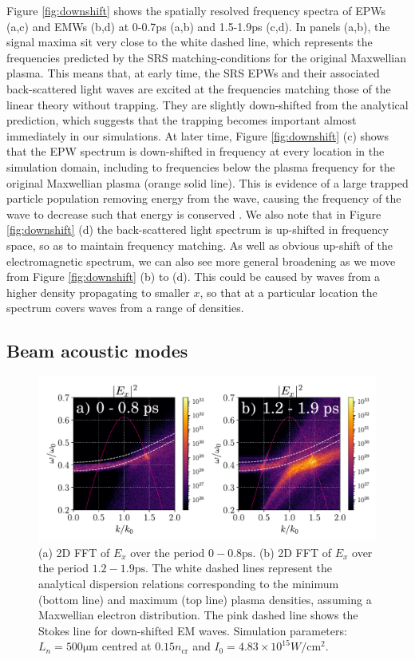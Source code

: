 Figure \ref{fig:downshift} shows the spatially resolved frequency spectra of
EPWs (a,c) and EMWs (b,d) at 0-0.7ps
(a,b) and 1.5-1.9ps (c,d). In panels (a,b), the signal maxima sit very close to
the white dashed line, which represents the frequencies predicted by the SRS
matching-conditions for the original Maxwellian plasma. This means that, at
early time, the SRS EPWs and their associated back-scattered light
waves are excited at the frequencies matching those of the linear theory
without trapping.
They are slightly down-shifted from the analytical prediction, which suggests
that the trapping
becomes important almost immediately in our simulations.
At later time, Figure \ref{fig:downshift} (c) shows that the EPW spectrum is
down-shifted in frequency
at every location in the simulation domain, including to frequencies below the
plasma frequency for the original Maxwellian plasma (orange solid line).
This is evidence of a large trapped particle population removing energy from
the wave, causing the frequency of the wave
to decrease such that energy is conserved \citep{Morales1972}. We also note that
in Figure \ref{fig:downshift} (d) the back-scattered light spectrum is
up-shifted in frequency space, so as to maintain frequency matching. As well as obvious up-shift of the electromagnetic spectrum, we can also see more general broadening as we move from Figure \ref{fig:downshift} (b) to (d). This could be caused by waves from a higher density propagating to smaller $x$, so that at a particular location the spectrum covers waves from a range of densities.



\subsection{Beam acoustic modes}
\begin{figure}[ht]
    \centering
    \includegraphics[width=0.8\columnwidth]{Chapters/C4_iSRS/fig5_5a_5b.pdf}
    \caption{(a) 2D FFT of $E_x$ over the period $ 0 - 0.8 \si{\pico\second}$. (b) 2D FFT of $E_x$ over the period $1.2 - 1.9                                                                              
    \si{\pico\second}$.
    The white dashed lines represent the analytical dispersion relations corresponding to the minimum (bottom line) and maximum (top line) plasma densities,
    assuming a Maxwellian electron distribution.
    The pink dashed line shows the Stokes line for down-shifted EM waves.
    Simulation parameters: $L_n = 500 \si{\micro\metre} $ centred at $0.15n_\mathrm{cr}$
    and $I_0 = 4.83\times10^{15} \si{W/\centi\metre^2}$.
    }
    \label{fig:BAM}
\end{figure}{}


